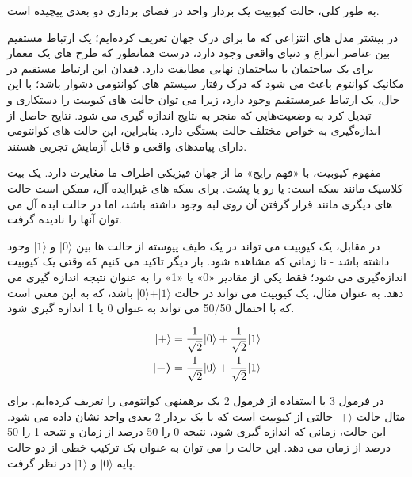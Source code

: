 \documentclass{book}
\begin{document}
 به طور کلی، حالت کیوبیت یک بردار واحد در فضای برداری دو بعدی پیچیده است.\pagebreak
 
در بیشتر مدل های انتزاعی که ما برای درک جهان تعریف کرده‌ایم؛ یک ارتباط مستقیم بین عناصر انتزاع و دنیای واقعی وجود دارد، درست همانطور که طرح های یک معمار برای یک ساختمان با ساختمان نهایی مطابقت دارد. فقدان این ارتباط مستقیم در مکانیک کوانتوم باعث می شود که درک رفتار سیستم های کوانتومی دشوار باشد؛ با این حال، یک ارتباط غیرمستقیم وجود دارد، زیرا می توان حالت های کیوبیت را دستکاری و تبدیل کرد به وضعیت‌هایی که منجر به نتایج اندازه گیری می شود. نتایج حاصل از اندازه‌گیری به خواص مختلف حالت بستگی دارد. بنابراین، این حالت های کوانتومی دارای پیامدهای واقعی و قابل آزمایش تجربی هستند.

مفهوم کیوبیت، با «فهم رایج» ما از جهان فیزیکی اطراف ما مغایرت دارد. یک بیت کلاسیک مانند سکه است: یا رو یا پشت. برای سکه های غیراایده آل، ممکن است حالت های دیگری مانند قرار گرفتن آن روی لبه وجود داشته باشد، اما در حالت ایده آل می توان آنها را نادیده گرفت. 

در مقابل، یک کیوبیت می تواند در یک طیف پیوسته از حالت ها بین $\vert0\rangle$ و $\vert1\rangle$ وجود داشته باشد - تا زمانی که مشاهده شود. بار دیگر تاکید می کنیم که وقتی یک کیوبیت اندازه‌گیری می شود؛ فقط یکی از مقادیر «0» یا «1» را به عنوان نتیجه اندازه گیری می دهد. به عنوان مثال، یک کیوبیت می تواند در حالت
 $\vert0\rangle + \vert1\rangle$ باشد، که به این معنی است که با احتمال 50/50 می تواند به عنوان 0 یا 1 اندازه گیری شود.

\begin{center}
	\begin{equation}\label{superposition}
		\begin{aligned}
			\vert+\rangle &= \frac{1}{\sqrt{2}} \vert 0\rangle + \frac{1}{\sqrt{2}} \vert 1\rangle \\
			\vspace{0.5cm}
			\boldsymbol{\vert-\rangle} &= \frac{1}{\sqrt{2}} \vert 0\rangle + \frac{1}{\sqrt{2}} \vert 1\rangle
		\end{aligned}
	\end{equation}
\end{center}

در فرمول 3 با استفاده از فرمول 2 یک برهمنهی کوانتومی را تعریف کرده‌ایم. 
برای مثال حالت $\vert+\rangle$ حالتی از کیوبیت است که با یک بردار 2 بعدی واحد نشان داده می شود. این حالت، زمانی که اندازه گیری شود، نتیجه 0 را 50 درصد از زمان و نتیجه 1 را 50 درصد از زمان می دهد. این حالت را می توان به عنوان یک ترکیب خطی از دو حالت پایه $\vert0\rangle$ و $\vert 1 \rangle$ در نظر گرفت.
\end{document}
